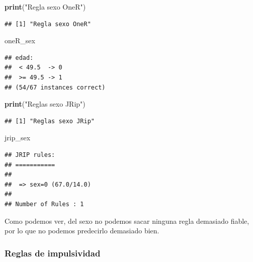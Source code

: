 \documentclass[]{article}
\newenvironment{Shaded}{\begin{snugshade}}{\end{snugshade}}
\newcommand{\KeywordTok}[1]{\textcolor[rgb]{0.13,0.29,0.53}{\textbf{#1}}}
\newcommand{\StringTok}[1]{\textcolor[rgb]{0.31,0.60,0.02}{#1}}
\newcommand{\NormalTok}[1]{#1}
\begin{document}
\begin{Shaded}
\begin{Highlighting}[]
\KeywordTok{print}\NormalTok{(}\StringTok{"Regla sexo OneR"}\NormalTok{)}
\end{Highlighting}
\end{Shaded}

\begin{verbatim}
## [1] "Regla sexo OneR"
\end{verbatim}

\begin{Shaded}
\begin{Highlighting}[]
\NormalTok{oneR_sex}
\end{Highlighting}
\end{Shaded}

\begin{verbatim}
## edad:
##  < 49.5  -> 0
##  >= 49.5 -> 1
## (54/67 instances correct)
\end{verbatim}

\begin{Shaded}
\begin{Highlighting}[]
\KeywordTok{print}\NormalTok{(}\StringTok{"Reglas sexo JRip"}\NormalTok{)}
\end{Highlighting}
\end{Shaded}

\begin{verbatim}
## [1] "Reglas sexo JRip"
\end{verbatim}

\begin{Shaded}
\begin{Highlighting}[]
\NormalTok{jrip_sex}
\end{Highlighting}
\end{Shaded}

\begin{verbatim}
## JRIP rules:
## ===========
## 
##  => sex=0 (67.0/14.0)
## 
## Number of Rules : 1
\end{verbatim}

Como podemos ver, del sexo no podemos sacar ninguna regla demasiado
fiable, por lo que no podemos predecirlo demasiado bien.

\subsubsection{Reglas de impulsividad}\label{reglas-de-impulsividad}
\end{document}
